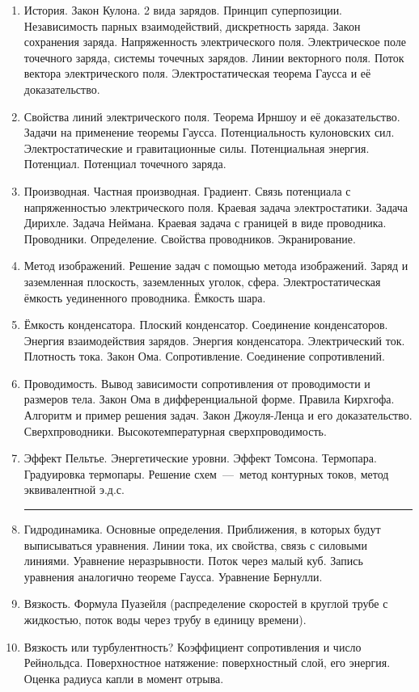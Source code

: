 \documentclass[12pt,a4paper,oneside,draft]{scrartcl}
\newlength{\h}
\begin{document}
\begin{enumerate}
\item История.  Закон Кулона. 2 вида зарядов.  Принцип
  суперпозиции. Независимость парных взаимодействий, дискретность
  заряда. Закон сохранения заряда. Напряженность электрического
  поля. Электрическое поле точечного заряда, системы точечных зарядов.
  Линии векторного поля. Поток вектора электрического поля.
  Электростатическая теорема Гаусса и её доказательство.
\item Свойства линий электрического поля. Теорема Ирншоу и её
  доказательство. Задачи на применение теоремы Гаусса.
  Потенциальность кулоновских сил. Электростатические и гравитационные
  силы. Потенциальная энергия. Потенциал. Потенциал точечного заряда.
\item Производная. Частная производная. Градиент. Связь потенциала с
  напряженностью электрического поля. Краевая задача
  электростатики. Задача Дирихле. Задача Неймана. Краевая задача с
  границей в виде проводника.  Проводники. Определение. Свойства
  проводников. Экранирование.
\item Метод изображений. Решение задач с помощью метода изображений.
  Заряд и заземленная плоскость, заземленных уголок, сфера.
  Электростатическая ёмкость уединенного проводника. Ёмкость шара.
\item Ёмкость конденсатора. Плоский конденсатор. Соединение
  конденсаторов. Энергия взаимодействия зарядов. Энергия
  конденсатора. Электрический ток. Плотность тока. Закон
  Ома. Сопротивление. Соединение сопротивлений.
\item Проводимость. Вывод зависимости сопротивления от проводимости и
  размеров тела. Закон Ома в дифференциальной форме. Правила
  Кирхгофа. Алгоритм и пример решения задач. Закон Джоуля-Ленца и его
  доказательство. Сверхпроводники. Высокотемпературная
  сверхпроводимость.
\item Эффект Пельтье. Энергетические уровни. Эффект
  Томсона. Термопара. Градуировка термопары. Решение схем~---~метод
  контурных токов, метод эквивалентной э.д.с.
\smallskip
\hrule
\item Гидродинамика. Основные определения. Приближения, в которых
  будут выписываться уравнения. Линии тока, их свойства, связь с
  силовыми линиями. Уравнение неразрывности. Поток через малый
  куб. Запись уравнения аналогично теореме Гаусса. Уравнение Бернулли.
\item Вязкость. Формула Пуазейля (распределение скоростей в
  круглой трубе с жидкостью, поток воды через трубу в единицу
  времени).
\item Вязкость или турбулентность? Коэффициент сопротивления и число
  Рейнольдса. Поверхностное натяжение: поверхностный слой, его
  энергия. Оценка радиуса капли в момент отрыва.

\end{enumerate}
\end{document}

